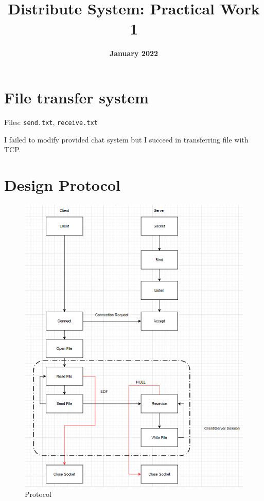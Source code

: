 \documentclass[12pt]{article}
\title{\textbf{Distribute System: Practical Work 1 }}
\date{\textbf{January 2022}}
\begin{document}
\maketitle

\section{File transfer system}
\hspace{1.5cm}
 Files: \texttt{send.txt}, \texttt{receive.txt}
 
\vspace{0.5cm}
I failed to modify provided chat system but I succeed in transferring file with TCP.
\vspace{2cm}

\section{Design Protocol}
\begin{figure}
    \includegraphics{Image/lab1.png}
    \caption{Protocol}
    \label{fig:my_label}
\end{figure}
\end{document}
